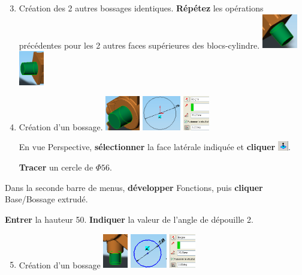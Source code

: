 \begin{enumerate}
\setcounter{enumi}{2}
 \item  Création des 2 autres bossages identiques.
  \textbf{Répétez} les opérations précédentes pour les 2 autres faces supérieures des blocs-cylindre.
 \includegraphics[height=1.5cm]{img/SW-004.png}
 \includegraphics[height=1.5cm]{img/SW-005.png}
 \item Création d'un bossage. 
\includegraphics[height=1.5cm]{img/SW-006.png}
\includegraphics[height=1.5cm]{img/SW-007.png}
\includegraphics[height=1.5cm]{img/SW-008.png}

En vue Perspective, \textbf{sélectionner} la face latérale indiquée et \textbf{cliquer} \includegraphics[height=0.4cm]{img/SW-009.png}.

\textbf{Tracer} un cercle de $\Phi 56$.
\end{enumerate}

Dans la seconde barre de menus, \textbf{développer} Fonctions, puis \textbf{cliquer} Base/Bossage extrudé. 

\textbf{Entrer} la hauteur 50. \textbf{Indiquer} la valeur de l'angle de dépouille 2\textdegree. 

\begin{enumerate}
\setcounter{enumi}{4}
 \item  Création d'un bossage
\includegraphics[height=1.5cm]{img/SW-013.png}
\includegraphics[height=1.5cm]{img/SW-014.png}
\includegraphics[height=1.5cm]{img/SW-015.png}
\end{enumerate}

